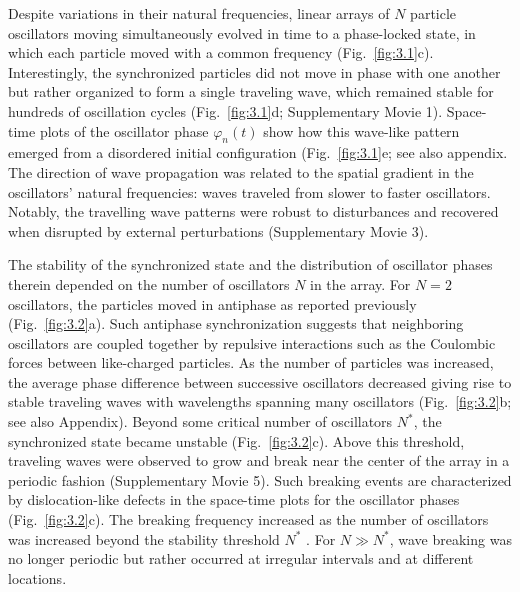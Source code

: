 Despite variations in their natural frequencies, linear arrays of $N$ particle oscillators moving simultaneously evolved in time to a phase-locked state, in which each particle moved with a common frequency (Fig.~\ref{fig:3.1}c). Interestingly, the synchronized particles did not move in phase with one another but rather organized to form a single traveling wave, which remained stable for hundreds of oscillation cycles (Fig.~\ref{fig:3.1}d; Supplementary Movie 1). Space-time plots of the oscillator phase $\varphi_n(t)$ show how this wave-like pattern emerged from a disordered initial configuration (Fig.~\ref{fig:3.1}e; see also appendix. The direction of wave propagation was related to the spatial gradient in the oscillators' natural frequencies: waves traveled from slower to faster oscillators. Notably, the travelling wave patterns were robust to disturbances and recovered when disrupted by external perturbations (Supplementary Movie 3).


The stability of the synchronized state and the distribution of oscillator phases therein depended on the number of oscillators $N$ in the array. For $N=2$ oscillators, the particles moved in antiphase as reported previously \autocite{Mersch2011} (Fig.~\ref{fig:3.2}a). Such antiphase synchronization suggests that neighboring oscillators are coupled together by repulsive interactions such as the Coulombic forces between like-charged particles. As the number of particles was increased, the average phase difference between successive oscillators decreased giving rise to stable traveling waves with wavelengths spanning many oscillators (Fig.~\ref{fig:3.2}b; see also Appendix). Beyond some critical number of oscillators $N^*$, the synchronized state became unstable (Fig.~\ref{fig:3.2}c). Above this threshold, traveling waves were observed to grow and break near the center of the array in a periodic fashion (Supplementary Movie 5). Such breaking events are characterized by dislocation-like defects in the space-time plots for the oscillator phases (Fig.~\ref{fig:3.2}c). The breaking frequency increased as the number of oscillators was increased beyond the stability threshold $N^*$ . For $N\gg N^*$, wave breaking was no longer periodic but rather occurred at irregular intervals and at different locations.
    
